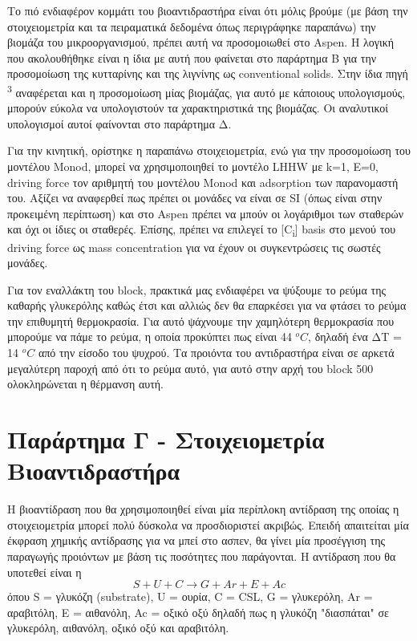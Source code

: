 \documentclass[11pt]{article}
\makeatletter
\newcommand{\citeprocitem}[2]{\hyper@linkstart{cite}{citeproc_bib_item_#1}#2\hyper@linkend}
\makeatother
\begin{document}
Το πιό ενδιαφέρον κομμάτι του βιοαντιδραστήρα είναι ότι μόλις βρούμε (με βάση την στοιχειομετρία και τα πειραματικά δεδομένα όπως περιγράφηκε παραπάνω) την βιομάζα του μικροοργανισμού, πρέπει αυτή να προσομοιωθεί στο Aspen. Η λογική που ακολουθήθηκε είναι η ίδια με αυτή που φαίνεται στο παράρτημα Β για την προσομοίωση της κυτταρίνης και της λιγνίνης ως conventional solids. Στην ίδια πηγή \textsuperscript{\citeprocitem{3}{3}} αναφέρεται και η προσομοίωση μίας βιομάζας, για αυτό με κάποιους υπολογισμούς, μπορούν εύκολα να υπολογιστούν τα χαρακτηριστικά της βιομάζας. Οι αναλυτικοί υπολογισμοί αυτοί φαίνονται στο παράρτημα Δ.

Για την κινητική, ορίστηκε η παραπάνω στοιχειομετρία, ενώ για την προσομοίωση του μοντέλου Monod, μπορεί να χρησιμοποιηθεί το μοντέλο LHHW με k=1, E=0, driving force τον αριθμητή του μοντέλου Monod και adsorption των παρανομαστή του. Αξίζει να αναφερθεί πως πρέπει οι μονάδες να είναι σε SI (όπως είναι στην προκειμένη περίπτωση) και στο Aspen πρέπει να μπούν οι λογάριθμοι των σταθερών και όχι οι ίδιες οι σταθερές. Επίσης, πρέπει να επιλεγεί το [C\textsubscript{i}] basis στο μενού του driving force ως mass concentration για να έχουν οι συγκεντρώσεις τις σωστές μονάδες.

Για τον εναλλάκτη του block, πρακτικά μας ενδιαφέρει να ψύξουμε το ρεύμα της καθαρής γλυκερόλης καθώς έτσι και αλλιώς δεν θα επαρκέσει για να φτάσει το ρεύμα την επιθυμητή θερμοκρασία. Για αυτό ψάχνουμε την χαμηλότερη θερμοκρασία που μπορούμε να πάμε το ρεύμα, η οποία προκύπτει πως είναι 44 \(^oC\), δηλαδή ένα ΔΤ = 14 \(^oC\) από την είσοδο του ψυχρού. Τα προιόντα του αντιδραστήρα είναι σε αρκετά μεγαλύτερη παροχή από ότι το ρεύμα αυτό, για αυτό στην αρχή του block 500 ολοκληρώνεται η θέρμανση αυτή.

\section{Παράρτημα Γ - Στοιχειομετρία Βιοαντιδραστήρα}
\label{sec:org159c300}

Η βιοαντίδραση που θα χρησιμοποιηθεί είναι μία περίπλοκη αντίδραση της οποίας η στοιχειομετρία μπορεί πολύ δύσκολα να προσδιοριστεί ακριβώς. Επειδή απαιτείται μία έκφραση χημικής αντίδρασης για να μπεί στο ασπεν, θα γίνει μία προσέγγιση της παραγωγής προιόντων με βάση τις ποσότητες που παράγονται. Η αντίδραση που θα υποτεθεί είναι η
\[ S + U + C \rightarrow G + Ar + E + Ac\]
όπου S = γλυκόζη (substrate), U = ουρία, C = CSL, G = γλυκερόλη, Ar = αραβιτόλη, Ε = αιθανόλη, Ac = οξικό οξύ
δηλαδή πως η γλυκόζη "διασπάται" σε γλυκερόλη, αιθανόλη, οξικό οξύ και αραβιτόλη.
\end{document}
